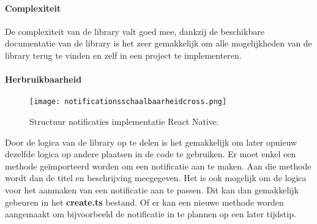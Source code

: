 \paragraph{Complexiteit}
De complexiteit van de library valt goed mee, dankzij de beschikbare documentatie van de library is het zeer 
gemakkelijk om alle mogelijkheden van de library terug te vinden en zelf in een project te implementeren. 

\paragraph{Herbruikbaarheid}
\begin{figure}[H]
    \centering
    \texttt{[image: notificationsschaalbaarheidcross.png]}
    \caption{Structuur notificaties implementatie React Native.}
\end{figure}
Door de logica van de library op te delen is het gemakkelijk om later opnieuw dezelfde logica op andere plaatsen 
in de code te gebruiken. Er moet enkel een methode geïmporteerd worden om een notificatie aan te maken. Aan die methode 
wordt dan de titel en beschrijving meegegeven. Het is ook mogelijk om de logica voor het aanmaken van een notificatie 
aan te passen. Dit kan dan gemakkelijk gebeuren in het \textbf{create.ts} bestand. Of er kan een nieuwe methode worden 
aangemaakt om bijvoorbeeld de notificatie in te plannen op een later tijdstip.